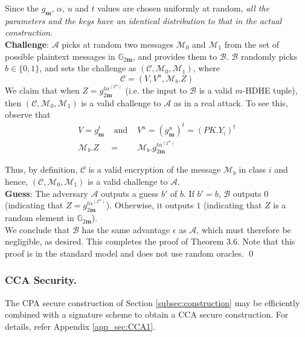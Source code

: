 \noindent Since the $g_{\mathbf{m}}$, $\alpha$, $u$ and $t$ values are chosen uniformly at random, \emph{all the parameters and the keys have an identical distribution to that in the actual construction}.\\
 
\noindent \textbf{Challenge}: $\mathcal{A}$ picks at random two messages $\mathcal{M}_0$ and $\mathcal{M}_1$ from the set of possible plaintext messages in $\mathbb{G}_{2\mathbf{m}}$, and provides them to $\mathcal{B}$. $\mathcal{B}$ randomly picks $b\in\{0,1\}$, and sets the challenge as $(\mathcal{C},\mathcal{M}_0,\mathcal{M}_1)$, where 
\begin{equation}
 \mathcal{C}=(V,V^u,\mathcal{M}_b.Z) \nonumber
\end{equation}
\noindent We claim that when $Z=g^{t\alpha^{(2^m)}}_{2\mathbf{m}}$ (i.e. the input to $\mathcal{B}$ is a valid $m$-HDHE tuple), then $(\mathcal{C},\mathcal{M}_0,\mathcal{M}_1)$ is a valid challenge to $\mathcal{A}$ as in a real attack. To see this, observe that
\begin{eqnarray}
V=g^{t}_{\mathbf{m}}  &\text{ and }&  V^u= \left(g^u_{\mathbf{m}}\right)^{t}=(PK.Y_i)^{t}\nonumber \\
\mathcal{M}_b.Z&=&\mathcal{M}_b.g^{t\alpha^{(2^m)}}_{2\mathbf{m}}\nonumber
\end{eqnarray}

\noindent Thus, by definition, $\mathcal{C}$ is a valid encryption of the message $\mathcal{M}_b$ in class $i$ and hence, $(\mathcal{C},\mathcal{M}_0,\mathcal{M}_1)$ is a valid challenge to $\mathcal{A}$. \\
 
\noindent \textbf{Guess}: The adversary $\mathcal{A}$ outputs a guess $b'$ of $b$. If $b' = b$, $\mathcal{B}$ outputs $0$ (indicating that $Z=g^{t\alpha^{(2^m)}}_{2\mathbf{m}}$). Otherwise, it outputs $1$ (indicating that $Z$ is a random element in $\mathbb{G}_{2\mathbf{m}}$).\\ 

\noindent We conclude that $\mathcal{B}$ has the same advantage $\epsilon$ as $\mathcal{A}$, which must therefore be negligible, as desired. This completes the proof of Theorem 3.6. Note that this proof is in the standard model and does not use random oracles. \hfill\qed 

\subsubsection{CCA Security.} The CPA secure construction of Section \ref{subsec:construction} may be efficiently combined with a signature scheme to obtain a CCA secure construction. For details, refer Appendix \ref{app_sec:CCA1}.



